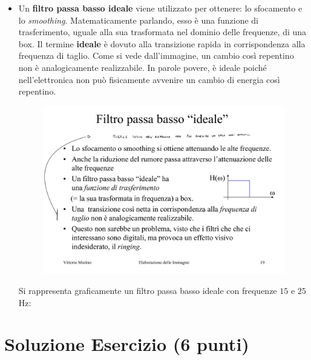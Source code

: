 \documentclass[a4paper]{article}
\begin{document}
\begin{itemize}
		\item Un \textbf{filtro passa basso ideale} viene utilizzato per ottenere: lo sfocamento e lo \emph{smoothing}. Matematicamente parlando, esso è una funzione di trasferimento, uguale alla sua trasformata nel dominio delle frequenze, di una box.\newline
		Il termine \textbf{ideale} è dovuto alla transizione rapida in corrispondenza alla frequenza di taglio. Come si vede dall'immagine, un cambio così repentino non è analogicamente realizzabile.\newline
		In parole povere, è ideale poiché nell'elettronica non può fisicamente avvenire un cambio di energia così repentino.\newline
		\begin{figure}[!htp]
			\centering
			\includegraphics[width=.35\textwidth]{img/box_filtro_passa_bassa_ideale.pdf}
		\end{figure}
			
		\noindent
		Si rappresenta graficamente un filtro passa basso ideale con frequenze $15$ e $25$ Hz:
	\end{itemize}\newpage
	
	\section{Soluzione Esercizio (6 punti)}
\end{document}
